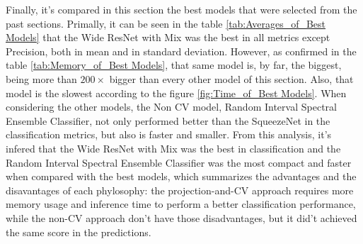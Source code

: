 Finally, it's compared in this section the best models that were selected from the past sections. Primally, it can be seen in the table \ref{tab:Averages_of_Best Models} that the Wide ResNet with \acrshort{Mix} was the best in all metrics except Precision, both in mean and in standard deviation. However, as confirmed in the table \ref{tab:Memory_of_Best Models}, that same model is, by far, the biggest, being more than $200\times$ bigger than every other model of this section. Also, that model is the slowest according to the figure \ref{fig:Time_of_Best Models}. When considering the other models, the Non \acrshort{CV} model, Random Interval Spectral Ensemble Classifier, not only performed better than the SqueezeNet in the classification metrics, but also is faster and smaller. From this analysis, it's infered that the Wide ResNet with \acrshort{Mix} was the best in classification and the Random Interval Spectral Ensemble Classifier was the most compact and faster when compared with the best models, which summarizes the advantages and the disavantages of each phylosophy: the projection-and-\acrshort{CV} approach requires more memory usage and inference time to perform a better classification performance, while the non-\acrshort{CV} approach don't have those disadvantages, but it did't achieved the same score in the predictions.





